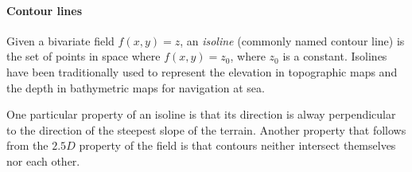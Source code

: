 %

\paragraph{Contour lines}

Given a bivariate field $f(x,y) = z$, an \emph{isoline} (commonly named contour line) is the set of points in space where $f(x,y) = z_0$, where $z_0$ is a constant. 
Isolines have been traditionally used to represent the elevation in topographic maps and the depth in bathymetric maps for navigation at sea. 

%

One particular property of an isoline is that its direction is alway perpendicular to the direction of the steepest slope of the terrain. 
Another property that follows from the $2.5D$ property of the field is that contours neither intersect themselves nor each other.

%

